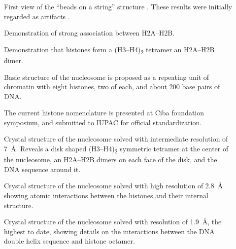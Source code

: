 {\begin{shaded}
\begin{description}
          \item[\cite{olins1974-nu-bodies}]
            First view of the ``beads on a string'' structure
            .
            These results were initially
            regarded as artifacts \citep{pardon-wilkins-1972model}.

          \item[\cite{anna-isenberg-1974-h2a-h2b}]
            Demonstration of strong association between H2A--H2B.

          \item[\cite{kornberg1974-results}]
            Demonstration that histones form a (H3--H4)\textsubscript{2} tetramer
            an H2A--H2B dimer.

          \item[\cite{kornberg1974-model}]
            Basic structure of the nucleosome is proposed as a repeating
            unit of chromatin with eight histones, two of each, and about
            200 base pairs of DNA.

          \item[\cite{bradbury1975-histone-nomenclature}]
            The current histone nomenclature is presented at Ciba foundation
            symposium, and submitted to IUPAC for official standardization.

          \item[\cite{richmond1984-7angstrom}]
            Crystal structure of the nucleosome solved with intermediate
            resolution of \SI{7}{\angstrom}.
            Reveals a disk shaped (H3--H4)\textsubscript{2} symmetric
            tetramer at the center of the nucleosome, an H2A--H2B dimers
            on each face of the disk, and the DNA sequence around it.

          \item[\cite{luger1997-28angstrom}]
            Crystal structure of the nucleosome solved with high
            resolution of \SI{2.8}{\angstrom} showing atomic interactions
            between the histones and their internal structure.

          \item[\cite{richmond-1kx5-19ansgtrom}]
            Crystal structure of the nucleosome solved with resolution of
            \SI{1.9}{\angstrom}, the highest to date, showing details on
            the interactions between the DNA double helix sequence and
            histone octamer.
          \end{description}
        \end{shaded}
      }

